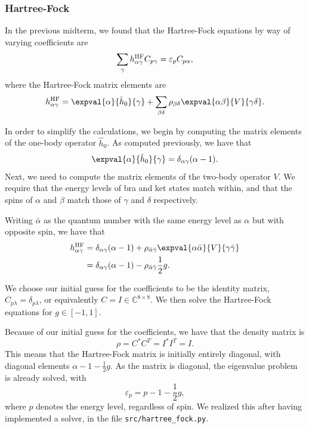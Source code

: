 \subsubsection*{Hartree-Fock}
In the previous midterm, we found that the Hartree-Fock equations by way of varying coefficients are
\begin{equation*}
    \sum_{\gamma} h_{\alpha\gamma}^{\mathrm{HF}} C_{p\gamma} = \varepsilon_p C_{p\alpha},
\end{equation*}
where the Hartree-Fock matrix elements are
\begin{equation*}
    h_{\alpha \gamma}^\HF = \expval{\alpha}{\hat{h}_0}{\gamma} + \sum_{\beta\delta} \rho_{\beta\delta} \expval{\alpha\beta}{V}{\gamma\delta}.
\end{equation*}

In order to simplify the calculations, we begin by computing the matrix elements of the one-body operator $\hat{h}_0$.
As computed previously, we have that
\begin{equation*}
    \expval{\alpha}{\hat{h}_0}{\gamma} = \delta_{\alpha\gamma} (\alpha - 1).
\end{equation*}
Next, we need to compute the matrix elements of the two-body operator $V$.
We require that the energy levels of bra and ket states match within, and that the spins of $\alpha$ and $\beta$ match those of $\gamma$ and $\delta$ respectively.

Writing $\bar{\alpha}$ as the quantum number with the same energy level as $\alpha$ but with opposite spin, we have that
\begin{align*}
    h_{\alpha\gamma}^\HF &= \delta_{\alpha\gamma} (\alpha - 1) + \rho_{\bar{\alpha}\bar{\gamma}} \expval{\alpha\bar{\alpha}}{V}{\gamma\bar{\gamma}} \\
    &= \delta_{\alpha\gamma} (\alpha - 1) - \rho_{\bar{\alpha}\bar{\gamma}} \frac{1}{2} g.
\end{align*}

We choose our initial guess for the coefficients to be the identity matrix, $C_{p\lambda} = \delta_{p\lambda}$, or equivalently $C = I \in \mathbb{C}^{8 \times 8}$.
We then solve the Hartree-Fock equations for $g \in [-1, 1]$.

Because of our initial guess for the coefficients, we have that the density matrix is
\begin{equation*}
    \rho = C^* C^T = I^* I^T = I.
\end{equation*}
This means that the Hartree-Fock matrix is initially entirely diagonal, with diagonal elements $\alpha - 1 - \frac{1}{2} g$.
As the matrix is diagonal, the eigenvalue problem is already solved, with
\begin{equation*}
    \varepsilon_p = p - 1 - \frac{1}{2} g,
\end{equation*}
where $p$ denotes the energy level, regardless of spin.
We realized this after having implemented a solver, in the file \verb|src/hartree_fock.py|.


